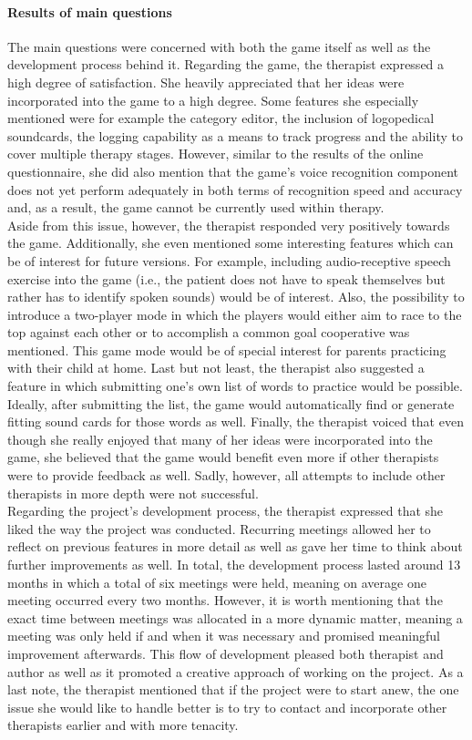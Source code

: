 \documentclass[draft,final]{vutinfth} %
\begin{document}
\paragraph{Results of main questions}
The main questions were concerned with both the game itself as well as the development process behind it. Regarding the game, the therapist expressed a high degree of satisfaction. She heavily appreciated that her ideas were incorporated into the game to a high degree. Some features she especially mentioned were for example the category editor, the inclusion of logopedical soundcards, the logging capability as a means to track progress and the ability to cover multiple therapy stages. However, similar to the results of the online questionnaire, she did also mention that the game's voice recognition component does not yet perform adequately in both terms of recognition speed and accuracy and, as a result, the game cannot be currently used within therapy. \\
Aside from this issue, however, the therapist responded very positively towards the game. Additionally, she even mentioned some interesting features which can be of interest for future versions. For example, including audio-receptive speech exercise into the game (i.e., the patient does not have to speak themselves but rather has to identify spoken sounds) would be of interest. Also, the possibility to introduce a two-player mode in which the players would either aim to race to the top against each other or to accomplish a common goal cooperative was mentioned. This game mode would be of special interest for parents practicing with their child at home. Last but not least, the therapist also suggested a feature in which submitting one's own list of words to practice would be possible. Ideally, after submitting the list, the game would automatically find or generate fitting sound cards for those words as well. Finally, the therapist voiced that even though she really enjoyed that many of her ideas were incorporated into the game, she believed that the game would benefit even more if other therapists were to provide feedback as well. Sadly, however, all attempts to include other therapists in more depth were not successful. \\
Regarding the project's development process, the therapist expressed that she liked the way the project was conducted. Recurring meetings allowed her to reflect on previous features in more detail as well as gave her time to think about further improvements as well. In total, the development process lasted around 13 months in which a total of six meetings were held, meaning on average one meeting occurred every two months. However, it is worth mentioning that the exact time between meetings was allocated in a more dynamic matter, meaning a meeting was only held if and when it was necessary and promised meaningful improvement afterwards. This flow of development pleased both therapist and author as well as it promoted a creative approach of working on the project. As a last note, the therapist mentioned that if the project were to start anew, the one issue she would like to handle better is to try to contact and incorporate other therapists earlier and with more tenacity.
\end{document}
